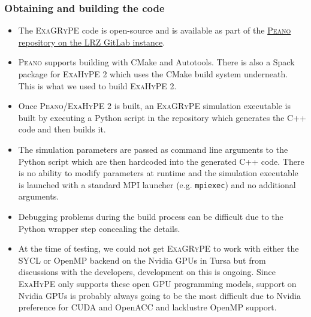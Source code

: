 \documentclass[12pt,a4paper]{article}
\numberwithin{figure}{subsection}
\newcommand{\exagrype}{\textsc{ExaGRyPE}\xspace}
\newcommand{\exahype}{\textsc{ExaHyPE}\xspace}
\newcommand{\peano}{\textsc{Peano}\xspace}
\begin{document}
\subsubsection{Obtaining and building the code}
\begin{itemize}
    \item The \exagrype code is open-source and is available as part of the
    \href{https://gitlab.lrz.de/hpcsoftware/Peano}{\peano repository on the LRZ
    GitLab instance}.
    \item \peano supports building with CMake and Autotools. There is also a
    Spack package for \exahype 2 which uses the CMake build system underneath.
    This is what we used to build \exahype 2.
    \item Once \peano/\exahype 2 is built, an \exagrype simulation executable is
    built by executing a Python script in the repository which generates the C++
    code and then builds it.
    \item The simulation parameters are passed as command line arguments to the
    Python script which are then hardcoded into the generated C++ code. There is
    no ability to modify parameters at runtime and the simulation executable is
    launched with a standard MPI launcher (e.g. \texttt{mpiexec}) and no
    additional arguments.
    \item Debugging problems during the build process can be difficult due to
    the Python wrapper step concealing the details.
    \item At the time of testing, we could not get \exagrype to work with either
    the SYCL or OpenMP backend on the Nvidia GPUs in Tursa but from discussions
    with the developers, development on this is ongoing. Since \exahype only
    supports these open GPU programming models, support on Nvidia GPUs is
    probably always going to be the most difficult due to Nvidia preference for
    CUDA and OpenACC and lacklustre OpenMP support.
\end{itemize}
\end{document}
